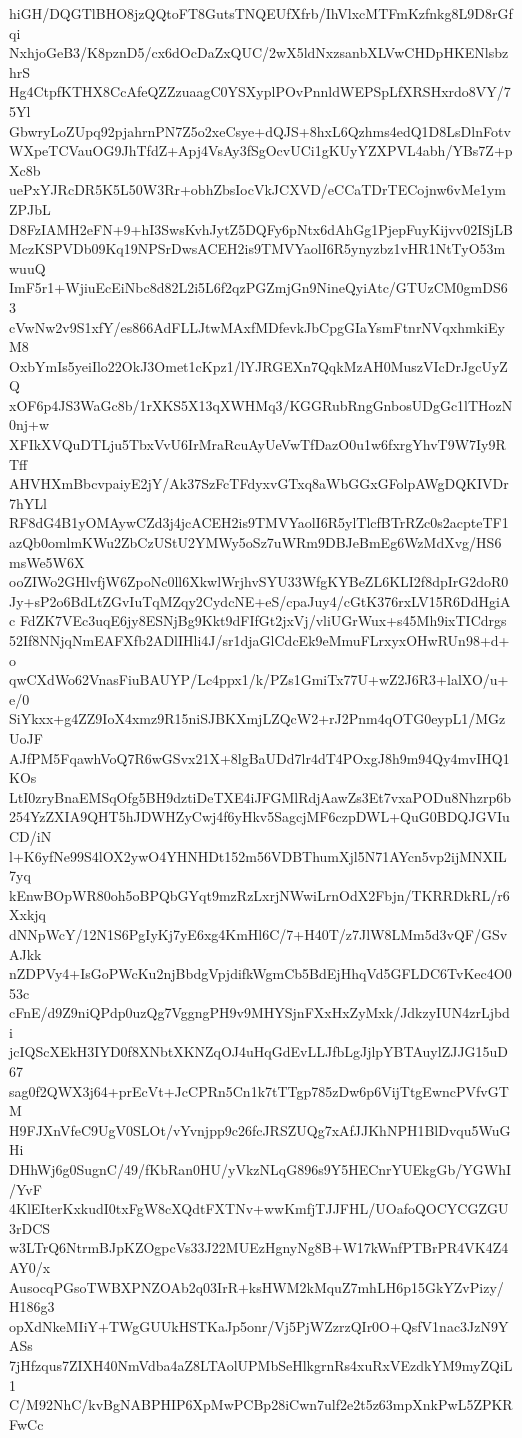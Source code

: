 hiGH/DQGTlBHO8jzQQtoFT8GutsTNQEUfXfrb/IhVlxcMTFmKzfnkg8L9D8rGfqi
NxhjoGeB3/K8pznD5/cx6dOcDaZxQUC/2wX5ldNxzsanbXLVwCHDpHKENlsbzhrS
Hg4CtpfKTHX8CcAfeQZZzuaagC0YSXyplPOvPnnldWEPSpLfXRSHxrdo8VY/75Yl
GbwryLoZUpq92pjahrnPN7Z5o2xeCsye+dQJS+8hxL6Qzhms4edQ1D8LsDlnFotv
WXpeTCVauOG9JhTfdZ+Apj4VsAy3fSgOcvUCi1gKUyYZXPVL4abh/YBs7Z+pXc8b
uePxYJRcDR5K5L50W3Rr+obhZbsIocVkJCXVD/eCCaTDrTECojnw6vMe1ymZPJbL
D8FzIAMH2eFN+9+hI3SwsKvhJytZ5DQFy6pNtx6dAhGg1PjepFuyKijvv02ISjLB
MczKSPVDb09Kq19NPSrDwsACEH2is9TMVYaolI6R5ynyzbz1vHR1NtTyO53mwuuQ
ImF5r1+WjiuEcEiNbc8d82L2i5L6f2qzPGZmjGn9NineQyiAtc/GTUzCM0gmDS63
cVwNw2v9S1xfY/es866AdFLLJtwMAxfMDfevkJbCpgGIaYsmFtnrNVqxhmkiEyM8
OxbYmIs5yeiIlo22OkJ3Omet1cKpz1/lYJRGEXn7QqkMzAH0MuszVIcDrJgcUyZQ
xOF6p4JS3WaGc8b/1rXKS5X13qXWHMq3/KGGRubRngGnbosUDgGc1lTHozN0nj+w
XFIkXVQuDTLju5TbxVvU6IrMraRcuAyUeVwTfDazO0u1w6fxrgYhvT9W7Iy9RTff
AHVHXmBbcvpaiyE2jY/Ak37SzFcTFdyxvGTxq8aWbGGxGFolpAWgDQKIVDr7hYLl
RF8dG4B1yOMAywCZd3j4jcACEH2is9TMVYaolI6R5ylTlcfBTrRZc0s2acpteTF1
azQb0omlmKWu2ZbCzUStU2YMWy5oSz7uWRm9DBJeBmEg6WzMdXvg/HS6msWe5W6X
ooZIWo2GHlvfjW6ZpoNc0ll6XkwlWrjhvSYU33WfgKYBeZL6KLI2f8dpIrG2doR0
Jy+sP2o6BdLtZGvIuTqMZqy2CydcNE+eS/cpaJuy4/cGtK376rxLV15R6DdHgiAc
FdZK7VEc3uqE6jy8ESNjBg9Kkt9dFIfGt2jxVj/vliUGrWux+s45Mh9ixTICdrgs
52If8NNjqNmEAFXfb2ADlIHli4J/sr1djaGlCdcEk9eMmuFLrxyxOHwRUn98+d+o
qwCXdWo62VnasFiuBAUYP/Lc4ppx1/k/PZs1GmiTx77U+wZ2J6R3+lalXO/u+e/0
SiYkxx+g4ZZ9IoX4xmz9R15niSJBKXmjLZQcW2+rJ2Pnm4qOTG0eypL1/MGzUoJF
AJfPM5FqawhVoQ7R6wGSvx21X+8lgBaUDd7lr4dT4POxgJ8h9m94Qy4mvIHQ1KOs
LtI0zryBnaEMSqOfg5BH9dztiDeTXE4iJFGMlRdjAawZs3Et7vxaPODu8Nhzrp6b
254YzZXIA9QHT5hJDWHZyCwj4f6yHkv5SagcjMF6czpDWL+QuG0BDQJGVIuCD/iN
l+K6yfNe99S4lOX2ywO4YHNHDt152m56VDBThumXjl5N71AYcn5vp2ijMNXIL7yq
kEnwBOpWR80oh5oBPQbGYqt9mzRzLxrjNWwiLrnOdX2Fbjn/TKRRDkRL/r6Xxkjq
dNNpWcY/12N1S6PgIyKj7yE6xg4KmHl6C/7+H40T/z7JlW8LMm5d3vQF/GSvAJkk
nZDPVy4+IsGoPWcKu2njBbdgVpjdifkWgmCb5BdEjHhqVd5GFLDC6TvKec4O053c
cFnE/d9Z9niQPdp0uzQg7VggngPH9v9MHYSjnFXxHxZyMxk/JdkzyIUN4zrLjbdi
jcIQScXEkH3IYD0f8XNbtXKNZqOJ4uHqGdEvLLJfbLgJjlpYBTAuylZJJG15uD67
sag0f2QWX3j64+prEcVt+JcCPRn5Cn1k7tTTgp785zDw6p6VijTtgEwncPVfvGTM
H9FJXnVfeC9UgV0SLOt/vYvnjpp9c26fcJRSZUQg7xAfJJKhNPH1BlDvqu5WuGHi
DHhWj6g0SugnC/49/fKbRan0HU/yVkzNLqG896s9Y5HECnrYUEkgGb/YGWhI/YvF
4KlEIterKxkudI0txFgW8cXQdtFXTNv+wwKmfjTJJFHL/UOafoQOCYCGZGU3rDCS
w3LTrQ6NtrmBJpKZOgpcVs33J22MUEzHgnyNg8B+W17kWnfPTBrPR4VK4Z4AY0/x
AusocqPGsoTWBXPNZOAb2q03IrR+ksHWM2kMquZ7mhLH6p15GkYZvPizy/H186g3
opXdNkeMIiY+TWgGUUkHSTKaJp5onr/Vj5PjWZzrzQIr0O+QsfV1nac3JzN9YASs
7jHfzqus7ZIXH40NmVdba4aZ8LTAolUPMbSeHlkgrnRs4xuRxVEzdkYM9myZQiL1
C/M92NhC/kvBgNABPHIP6XpMwPCBp28iCwn7ulf2e2t5z63mpXnkPwL5ZPKRFwCc
